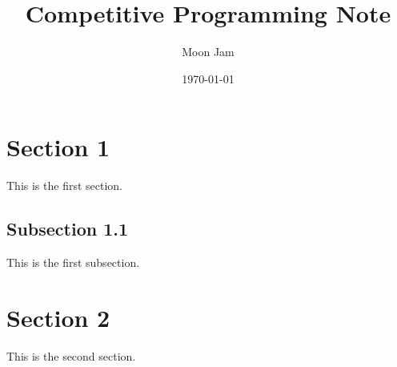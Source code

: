 \documentclass[a4paper]{article}  %
\title{Competitive Programming Note}  %
\author{Moon Jam}  %
\date{\today}
\begin{document}
\maketitle
\thispagestyle{empty}

\newpage


\tableofcontents

\newpage

\section{Section 1}
This is the first section.

\subsection{Subsection 1.1}
This is the first subsection.

\section{Section 2}
This is the second section.
\end{document}
